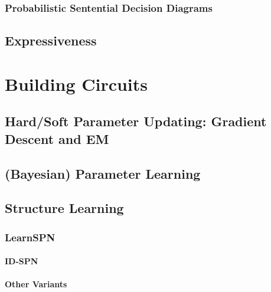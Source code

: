 			\subsubsection{Probabilistic Sentential Decision Diagrams} %

		\subsection{Expressiveness} %

	\section{Building Circuits} %

		\subsection{Hard/Soft Parameter Updating: Gradient Descent and EM} %

		\subsection{(Bayesian) Parameter Learning} %

		\subsection{Structure Learning} %

			\subsubsection{LearnSPN} %

				\paragraph{ID-SPN} %

				\paragraph{Other Variants} %

